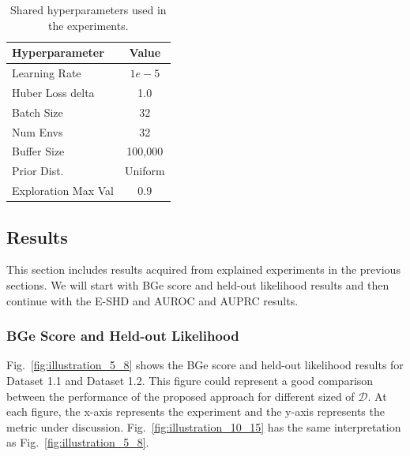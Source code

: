 \documentclass{lxaiproposal}
\begin{document}
    \begin{table}[h]
        \centering
        \begin{tabular}{|l|c|}
            \hline
            \textbf{Hyperparameter}  & \textbf{Value} \\
            \hline
            Learning Rate            & $1e-5$         \\
            Huber Loss delta         & 1.0            \\
            Batch Size               & 32             \\
            Num Envs\footnotemark[1] & 32             \\
            Buffer Size              & 100,000        \\
            Prior Dist.              & Uniform        \\
            Exploration Max Val      & 0.9            \\
            \hline
        \end{tabular}
        \caption{Shared hyperparameters used in the experiments.}
        \label{tab:shrd_hyperparameters}
    \end{table}


    \subsection{Results}\label{subsec:results}
    \vspace*{-3mm}

    This section includes results acquired from explained experiments in the previous sections. We will start with
    BGe score and held-out likelihood results and then continue with the E-SHD and AUROC and AUPRC results. %

    \subsubsection{BGe Score and Held-out Likelihood}
    \vspace*{-3mm}

    Fig.~\ref{fig:illustration_5_8} shows the BGe score and held-out likelihood results for Dataset 1.1 and Dataset 1.2.
    This figure could represent a good comparison between the performance of the proposed approach for different
    sized of $\mathcal{D}$. At each figure, the x-axis represents the experiment and the y-axis represents the metric
    under discussion. Fig.~\ref{fig:illustration_10_15} has the same
    interpretation as Fig.~\ref{fig:illustration_5_8}.
\end{document}
